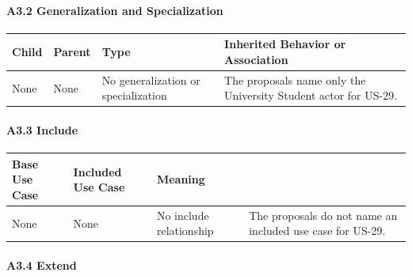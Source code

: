 \documentclass[12pt]{article}
\renewcommand{\baselinestretch}{1.5}
\begin{document}
\hypertarget{sec:a3-2-generalization-and-specialization}{}
\paragraph*{A3.2 Generalization and Specialization}
\par\medskip

\begingroup
\small
\renewcommand{\baselinestretch}{1.0}\selectfont
\renewcommand{\arraystretch}{1.15}
\setlength{\tabcolsep}{6pt}
\begin{longtable}{|>{\raggedright\arraybackslash}p{}|>{\raggedright\arraybackslash}p{}|>{\raggedright\arraybackslash}p{}|>{\raggedright\arraybackslash}p{}|}
\hline
\textbf{Child} & \textbf{Parent} & \textbf{Type} & \textbf{Inherited Behavior or Association} \\ \hline
\endhead
None & None & No generalization or specialization & The proposals name only the University Student actor for US-29. \\ \hline
\end{longtable}
\endgroup
\par\medskip

\hypertarget{sec:a3-3-include}{}
\paragraph*{A3.3 Include}
\par\medskip

\begingroup
\small
\renewcommand{\baselinestretch}{1.0}\selectfont
\renewcommand{\arraystretch}{1.15}
\setlength{\tabcolsep}{6pt}
\begin{longtable}{|>{\raggedright\arraybackslash}p{}|>{\raggedright\arraybackslash}p{}|>{\raggedright\arraybackslash}p{}|}
\hline
\textbf{Base Use Case} & \textbf{Included Use Case} & \textbf{Meaning} \\ \hline
\endhead
None & None & No include relationship & The proposals do not name an included use case for US-29. \\ \hline
\end{longtable}
\endgroup
\par\medskip

\hypertarget{sec:a3-4-extend}{}
\paragraph*{A3.4 Extend}
\par\medskip
\end{document}
